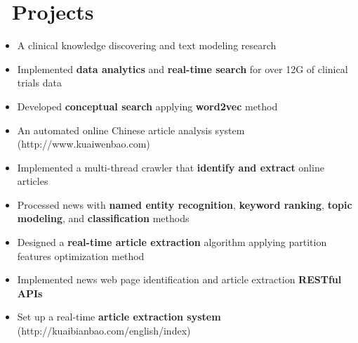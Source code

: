 \documentclass{resume}
\begin{document}
\section{\faTags\ Projects}



\begin{itemize}
  \item A clinical knowledge discovering and text modeling research	
  \item Implemented \textbf{data analytics} and \textbf{real-time search} for over 12G of clinical trials data
  \item Developed \textbf{conceptual search} applying \textbf{word2vec} method
\end{itemize}

\begin{itemize}
  \item An automated online Chinese article analysis system (http://www.kuaiwenbao.com)  
  \item Implemented a multi-thread crawler that \textbf{identify and extract} online articles
  \item Processed news with \textbf{named entity recognition}, \textbf{keyword ranking},  \textbf{topic modeling}, and \textbf{classification} methods
\end{itemize}


\begin{itemize}
  \item Designed a \textbf{real-time article extraction} algorithm applying partition features optimization method
  \item Implemented news web page identification and article extraction \textbf{RESTful APIs}
  \item Set up a real-time \textbf{article extraction system} (http://kuaibianbao.com/english/index)
\end{itemize}
\end{document}
